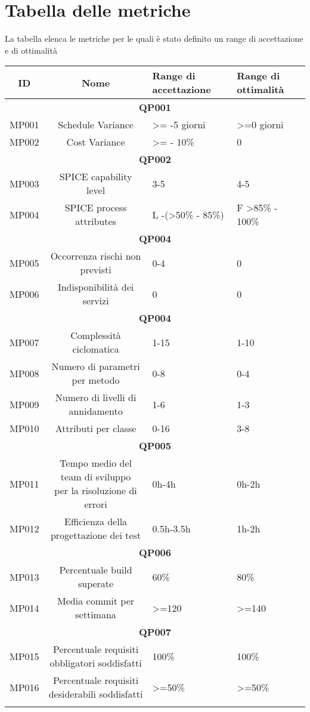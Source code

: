 \section{Tabella delle metriche}
\label{Tab2.2}
La tabella elenca le metriche per le quali è stato definito un range di accettazione e di ottimalità
\begin{tabularx}{\textwidth}{|c|c|X|X|}
	\hline 
	\textbf{ID} & \textbf{Nome} & \textbf{Range di accettazione}  & \textbf{Range di ottimalità}  \\ 
	\hline
	\multicolumn{4}{|c|}{\textbf{QP001}} \\
	\hline
	MP001 & Schedule Variance & >= -5 giorni & >=0 giorni \\ 
	\hline
	MP002 &Cost Variance& >= - 10\% &  0 \\ 
	\hline
	\multicolumn{4}{|c|}{\textbf{QP002}} \\
	\hline
	MP003 & SPICE capability level & 3-5 & 4-5 \\ 
	\hline 
	MP004 & SPICE process attributes & L -(>50\% - 85\%)  & F >85\% - 100\% \\ 
	\hline
	\multicolumn{4}{|c|}{\textbf{QP004}} \\
	\hline 
	MP005 & Occorrenza rischi non previsti &   0-4 &0 \\
	\hline 
	MP006 & Indisponibilità dei servizi & 0   & 0 \\
	\hline
	\multicolumn{4}{|c|}{\textbf{QP004}} \\
	\hline
	MP007 & Complessità ciclomatica & 1-15 & 1-10 \\ 
	\hline 
	MP008 & Numero di parametri per metodo & 0-8 & 0-4 \\ 
	\hline 
	MP009& Numero di livelli di annidamento & 1-6 & 1-3 \\ 
	\hline 
	MP010 & Attributi per classe & 0-16 & 3-8 \\ 
	\hline 
	\multicolumn{4}{|c|}{\textbf{QP005}} \\
	\hline
	MP011 &\makecell{Tempo medio del team di sviluppo \\ per la risoluzione di errori} & 0h-4h & 0h-2h \\ 
	\hline 
	MP012 & Efficienza della progettazione dei test  & 0.5h-3.5h  & 1h-2h \\ 
	\hline 
	\multicolumn{4}{|c|}{\textbf{QP006}} \\
	\hline
	MP013 & Percentuale build superate& 60\% & 80\%\\
	\hline
	MP014 & Media commit per settimana & >=120 & >=140\\
	\hline
	\multicolumn{4}{|c|}{\textbf{QP007}} \\
	\hline
	MP015& \makecell{Percentuale requisiti \\ obbligatori soddisfatti}& 100\% & 100\%  \\
	\hline
	MP016& \makecell{Percentuale requisiti \\ desiderabili soddisfatti}& >=50\% &>=50\% \\
	\hline
	\caption{Tabella delle metriche dei processi}
\end{tabularx}